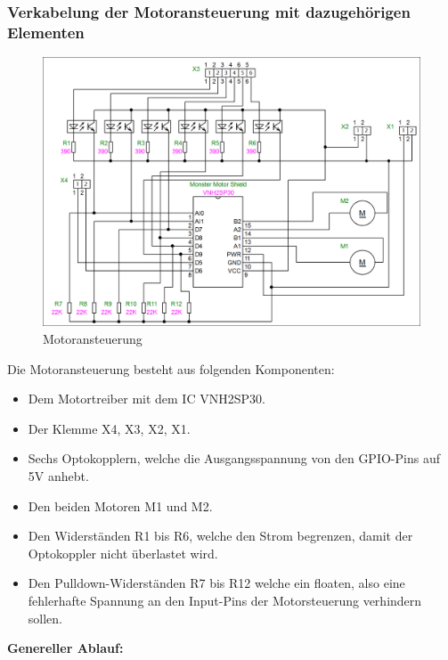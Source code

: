 \subsubsection{Verkabelung der Motoransteuerung mit dazugehörigen Elementen}
\begin{figure}[H] 

\begin{center}

\includegraphics[width=15cm]{Bilder/Schaltplan/Motoransteuerung}
\caption{Motoransteuerung}
\label{Motoransteuerung}
\end{center}
\end{figure}
Die Motoransteuerung besteht aus folgenden Komponenten:\\
\begin{itemize}
\item Dem Motortreiber mit dem IC VNH2SP30.
\item Der Klemme X4, X3, X2, X1.
\item Sechs Optokopplern, welche die Ausgangsspannung von den GPIO-Pins auf 5V anhebt.
\item Den beiden Motoren M1 und M2.
\item Den Widerständen R1 bis R6, welche den Strom begrenzen, damit der Optokoppler nicht überlastet wird.
\item Den Pulldown-Widerständen R7 bis R12 welche ein floaten, also eine fehlerhafte Spannung an den Input-Pins der Motorsteuerung verhindern sollen. \\
\end{itemize}
\textbf{Genereller Ablauf:}
